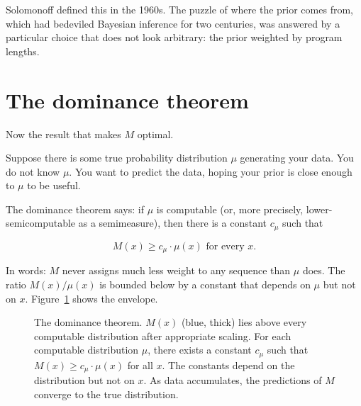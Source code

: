 Solomonoff defined this in the 1960s. The puzzle of where the prior comes from, which had bedeviled Bayesian inference for two centuries, was answered by a particular choice that does not look arbitrary: the prior weighted by program lengths.

\section*{The dominance theorem}

Now the result that makes $M$ optimal.

Suppose there is some true probability distribution $\mu$ generating your data. You do not know $\mu$. You want to predict the data, hoping your prior is close enough to $\mu$ to be useful.

The dominance theorem says: if $\mu$ is computable (or, more precisely, lower-semicomputable as a semimeasure), then there is a constant $c_\mu$ such that

$$M(x) \geq c_\mu \cdot \mu(x) \text{ for every } x.$$

In words: $M$ never assigns much less weight to any sequence than $\mu$ does. The ratio $M(x) / \mu(x)$ is bounded below by a constant that depends on $\mu$ but not on $x$. Figure~\ref{fig:dominance} shows the envelope.

\begin{figure}[h]
\centering
{}
\caption{The dominance theorem. $M(x)$ (blue, thick) lies above every computable distribution after appropriate scaling. For each computable distribution $\mu$, there exists a constant $c_\mu$ such that $M(x) \geq c_\mu \cdot \mu(x)$ for all $x$. The constants depend on the distribution but not on $x$. As data accumulates, the predictions of $M$ converge to the true distribution.}
\label{fig:dominance}
\end{figure}

